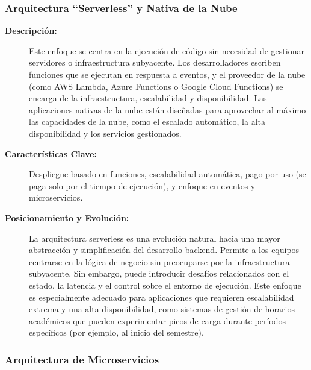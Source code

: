 \subsubsection*{Arquitectura ``Serverless'' y Nativa de la Nube \cite{aws_serverless}}
\begin{description}
    \item[\textbf{Descripción:}] Este enfoque se centra en la ejecución de código sin necesidad de gestionar servidores o infraestructura subyacente. Los desarrolladores escriben funciones que se ejecutan en respuesta a eventos, y el proveedor de la nube (como AWS Lambda, Azure Functions o Google Cloud Functions) se encarga de la infraestructura, escalabilidad y disponibilidad. Las aplicaciones nativas de la nube están diseñadas para aprovechar al máximo las capacidades de la nube, como el escalado automático, la alta disponibilidad y los servicios gestionados.
    \item[\textbf{Características Clave:}] Despliegue basado en funciones, escalabilidad automática, pago por uso (se paga solo por el tiempo de ejecución), y enfoque en eventos y microservicios.
    \item[\textbf{Posicionamiento y Evolución:}] La arquitectura serverless es una evolución natural hacia una mayor abstracción y simplificación del desarrollo backend. Permite a los equipos centrarse en la lógica de negocio sin preocuparse por la infraestructura subyacente. Sin embargo, puede introducir desafíos relacionados con el estado, la latencia y el control sobre el entorno de ejecución.
    Este enfoque es especialmente adecuado para aplicaciones que requieren escalabilidad extrema y una alta disponibilidad, como sistemas de gestión de horarios académicos que pueden experimentar picos de carga durante períodos específicos (por ejemplo, al inicio del semestre).
\end{description}

\subsubsection*{Arquitectura de Microservicios \cite{ms_microservices}}

